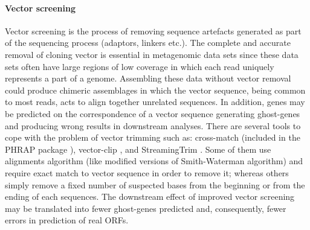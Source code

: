 \paragraph{Vector screening}
Vector screening is the process of removing sequence artefacts generated as part of the sequencing process (adaptors, linkers etc.). The complete and accurate removal of cloning vector is essential in metagenomic data sets since these data sets often have large regions of low coverage in which each read uniquely represents a part of a genome. Assembling these data without vector removal could produce chimeric assemblages in which the vector sequence, being common to most reads, acts to align together unrelated sequences. In addition, genes may be predicted on the correspondence of a vector sequence generating ghost-genes and producing wrong results in downstream analyses. There are several tools to cope with the problem of vector trimming such as: cross-match (included in the PHRAP package \cite{bastide2007assembling}), vector-clip \cite{staden1999staden}, and StreamingTrim \cite{bacci2014streamingtrim}. Some of them use alignments algorithm (like modified versions of Smith-Waterman algorithm) and require exact match to vector sequence in order to remove it; whereas others simply remove a fixed number of suspected bases from the beginning or from the ending of each sequences. The downstream effect of improved vector screening may be translated into fewer ghost-genes predicted and, consequently, fewer errors in prediction of real ORFs.\\

